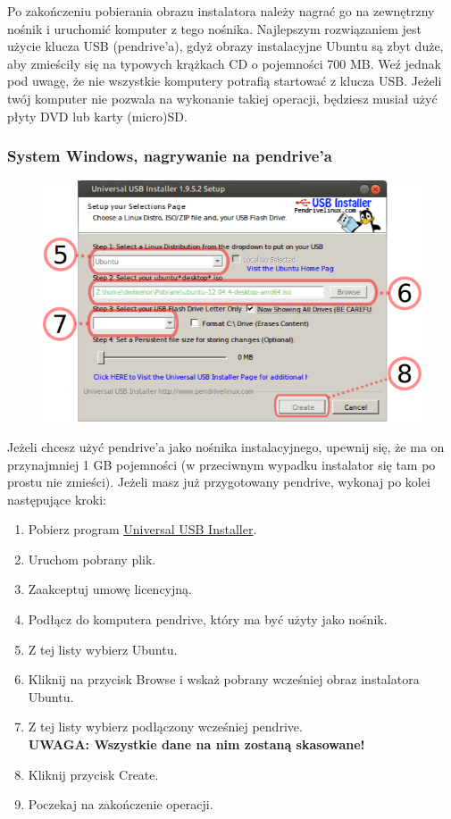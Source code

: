 \label{nagrywanie_obrazu}
Po zakończeniu pobierania obrazu instalatora należy nagrać go na zewnętrzny nośnik i uruchomić komputer z tego nośnika. Najlepszym rozwiązaniem jest użycie klucza USB (pendrive'a), gdyż obrazy instalacyjne Ubuntu są zbyt duże, aby zmieściły się na typowych krążkach CD o pojemności 700 MB. Weź jednak pod uwagę, że nie wszystkie komputery potrafią startować z klucza USB. Jeżeli twój komputer nie pozwala na wykonanie takiej operacji, będziesz musiał użyć płyty DVD lub karty (micro)SD.
\subsubsection{System Windows, nagrywanie na pendrive'a}
\begin{figure}
	\vspace{-10pt}
	\includegraphics[width=\linewidth]{images/instalacja_nagrywanie_obrazu.png}
\end{figure}

Jeżeli chcesz użyć pendrive'a jako nośnika instalacyjnego, upewnij się, że ma on przynajmniej 1 GB pojemności (w przeciwnym wypadku instalator się tam po prostu nie zmieści). Jeżeli masz już przygotowany pendrive, wykonaj po kolei następujące kroki:
\begin{enumerate}[label=\protect\circled{\arabic*}]
\item Pobierz program \href{http://www.pendrivelinux.com/downloads/Universal-USB-Installer/Universal-USB-Installer-1.9.5.2.exe}{Universal USB Installer}.
\item Uruchom pobrany plik.
\item Zaakceptuj umowę licencyjną.
\item Podłącz do komputera pendrive, który ma być użyty jako nośnik.
\item Z tej listy wybierz Ubuntu.
\item Kliknij na przycisk \textcolor{ubuntu_orange}{Browse} i wskaż pobrany wcześniej obraz instalatora Ubuntu.
\item Z tej listy wybierz podłączony wcześniej pendrive.\\
\textbf{UWAGA: Wszystkie dane na nim zostaną skasowane!}
\item Kliknij przycisk \textcolor{ubuntu_orange}{Create}.
\item Poczekaj na zakończenie operacji.
\end{enumerate}
\clearpage
